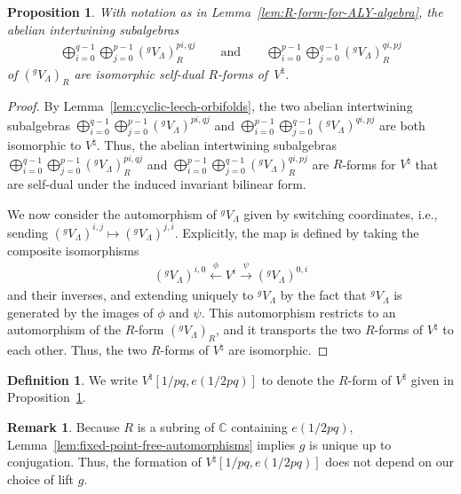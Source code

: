 \documentclass[pdftex]{sigma}
\newcommand{\bC}{\mathbb{C}}
\newtheorem{prop}[thm]{Proposition}
\theoremstyle{definition}
\newtheorem{defn}[thm]{Definition}
\newtheorem{rem}[thm]{Remark}
\begin{document}
\begin{prop} \label{prop:R-forms-of-moonshine}
With notation as in Lemma~{\rm \ref{lem:R-form-for-ALY-algebra}}, the abelian intertwining subalgebras
\begin{gather*} \bigoplus_{i=0}^{q-1} \bigoplus_{j=0}^{p-1} ({}^gV_\Lambda)_R^{pi,qj} \qquad \text{and} \qquad \bigoplus_{i=0}^{p-1} \bigoplus_{j=0}^{q-1} ({}^gV_\Lambda)_R^{qi,pj}\end{gather*} of $({}^gV_\Lambda)_R$ are isomorphic self-dual $R$-forms of~$V^\natural$.
\end{prop}
\begin{proof}By Lemma~\ref{lem:cyclic-leech-orbifolds}, the two abelian intertwining subalgebras $\bigoplus_{i=0}^{q-1} \bigoplus_{j=0}^{p-1} ({}^gV_\Lambda)^{pi,qj}$ and $\bigoplus_{i=0}^{p-1} \bigoplus_{j=0}^{q-1} ({}^gV_\Lambda)^{qi,pj}$ are both isomorphic to $V^\natural$. Thus, the abelian intertwining subalgebras $\bigoplus_{i=0}^{q-1} \bigoplus_{j=0}^{p-1} ({}^gV_\Lambda)_R^{pi,qj}$ and $\bigoplus_{i=0}^{p-1} \bigoplus_{j=0}^{q-1} ({}^gV_\Lambda)_R^{qi,pj}$ are $R$-forms for $V^\natural$ that are self-dual under the induced invariant bilinear form.

We now consider the automorphism of ${}^gV_\Lambda$ given by switching coordinates, i.e., sending $({}^gV_\Lambda)^{i,j} \mapsto ({}^gV_\Lambda)^{j,i}$. Explicitly, the map is defined by taking the composite isomorphisms
\begin{gather*} ({}^gV_\Lambda)^{i,0} \overset{\phi}{\leftarrow} V^i \overset{\psi}{\to} ({}^gV_\Lambda)^{0,i} \end{gather*}
and their inverses, and extending uniquely to ${}^gV_\Lambda$ by the fact that ${}^gV_\Lambda$ is generated by the images of $\phi$ and $\psi$. This automorphism restricts to an automorphism of the $R$-form $({}^gV_\Lambda)_R$, and it transports the two $R$-forms of $V^\natural$ to each other. Thus, the two $R$-forms of $V^\natural$ are isomorphic.
\end{proof}

\begin{defn}We write $V^\natural[1/pq,e(1/2pq)]$ to denote the $R$-form of $V^\natural$ given in Proposi\-tion~\ref{prop:R-forms-of-moonshine}.
\end{defn}

\begin{rem}Because $R$ is a subring of $\bC$ containing $e(1/2pq)$, Lemma~\ref{lem:fixed-point-free-automorphisms} implies $g$ is unique up to conjugation. Thus, the formation of $V^\natural[1/pq,e(1/2pq)]$ does not depend on our choice of lift $g$.
\end{rem}
\end{document}
